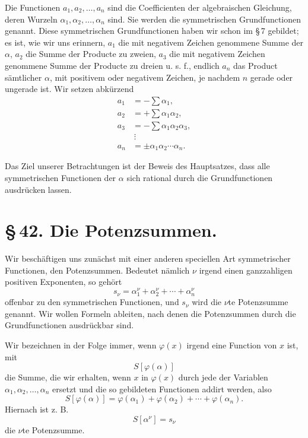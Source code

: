 \documentclass[11pt]{article}
\begin{document}
Die Functionen $a_1,a_2,\ldots,a_n$ sind die Coefficienten der algebraischen Gleichung, deren Wurzeln $\alpha_1,\alpha_2,\ldots,\alpha_n$ sind. Sie werden die symmetrischen Grundfunctionen genannt. Diese symmetrischen Grundfunctionen haben wir schon im \S\,7 gebildet; es ist, wie wir uns erinnern, $a_1$ die mit negativem Zeichen genommene Summe der $\alpha$, $a_2$ die Summe der Producte zu zweien, $a_3$ die mit negativem Zeichen genommene Summe der Producte zu dreien u. s. f., endlich $a_n$ das Product sämtlicher $\alpha$, mit positivem oder negativem Zeichen, je nachdem $n$ gerade oder ungerade ist. Wir setzen abkürzend
\begin{equation}
\begin{aligned}
 a_1&=-\sum \alpha_1,\\
 a_2&=+\sum \alpha_1\alpha_2,\\
 a_3&=-\sum \alpha_1\alpha_2\alpha_3,\\
 &\ \vdots\\
 a_n&=\pm \alpha_1\alpha_2\cdots\alpha_n.
\end{aligned}
\tag{3}
\end{equation}

Das Ziel unserer Betrachtungen ist der Beweis des Hauptsatzes, dass alle symmetrischen Functionen der $\alpha$ sich rational durch die Grundfunctionen ausdrücken lassen.

\section*{\S\,42. Die Potenzsummen.}

Wir beschäftigen uns zunächst mit einer anderen speciellen Art symmetrischer Functionen, den Potenzsummen. Bedeutet nämlich $\nu$ irgend einen ganzzahligen positiven Exponenten, so gehört
\begin{equation}
 s_\nu=\alpha_1^\nu+\alpha_2^\nu+\cdots+\alpha_n^\nu
\tag{1}
\end{equation}
offenbar zu den symmetrischen Functionen, und $s_\nu$ wird die $\nu$te Potenzsumme genannt. Wir wollen Formeln ableiten, nach denen die Potenzsummen durch die Grundfunctionen ausdrückbar sind.

Wir bezeichnen in der Folge immer, wenn $\varphi(x)$ irgend eine Function von $x$ ist, mit
\[
 S[\varphi(\alpha)]
\]
die Summe, die wir erhalten, wenn $x$ in $\varphi(x)$ durch jede der Variablen $\alpha_1,\alpha_2,\ldots,\alpha_n$ ersetzt und die so gebildeten Functionen addirt werden, also
\[
 S[\varphi(\alpha)]=\varphi(\alpha_1)+\varphi(\alpha_2)+\cdots+\varphi(\alpha_n).
\]
Hiernach ist z. B.
\[
 S[\alpha^\nu]=s_\nu
\]
die $\nu$te Potenzsumme.
\end{document}
